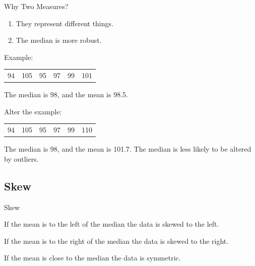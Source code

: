 \begin{frame}{Why Two Measures?}

  \begin{enumerate}
  \item They represent different things.
  \item The median is more robust.
  \end{enumerate}

  {
    Example: \\
    \begin{tabular}{llllll}
      94 & 105 & 95 & 97  & 99 & 101
    \end{tabular}

    {
      The median is 98, and the mean is 98.5.
    }
  }

  {
    Alter the example: \\
    \begin{tabular}{llllll}
      94 & 105 & 95 & 97  & 99 & {\color{red}110}
    \end{tabular}

    {
      The median is 98, and the mean is 101.7. The median is less
      likely to be altered by outliers.
    }
  }

  
  
\end{frame}

\subsection{Skew}

\begin{frame}{Skew}

  \begin{definition}
    If the mean is to the left of the median the data is skewed to the
    left.
  \end{definition}

  \begin{definition}
    If the mean is to the right of the median the data is skewed to
    the right.
  \end{definition}

  \begin{definition}[Symmetric]
    If the mean is close to the median the data is symmetric.
  \end{definition}
  
\end{frame}

